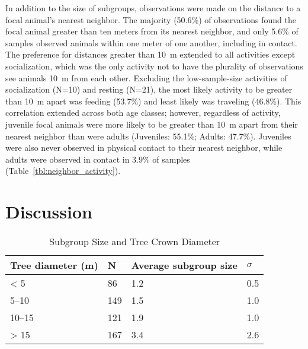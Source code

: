 \documentclass[american]{../../../coursework}
\begin{document}
In addition to the size of subgroups, observations were made on the distance
to a focal animal's nearest neighbor. The majority (50.6\%) of observations
found the focal animal greater than ten meters from its nearest neighbor, and
only 5.6\% of samples observed animals within one meter of one another,
including in contact. The preference for distances greater than
\SI{10}{\metre} extended to all activities except socialization, which was the
only activity not to have the plurality of observations see animals
\SI{10}{\metre} from each other. Excluding the low-sample-size activities of
socialization (N=10) and resting (N=21), the most likely activity to be
greater than \SI{10}{\metre} apart was feeding (53.7\%) and least likely was
traveling (46.8\%). This correlation extended across both age classes; however,
regardless of activity, juvenile focal animals were more likely to be greater
than \SI{10}{\metre} apart from their nearest neighbor than were adults
(Juveniles: 55.1\%; Adults: 47.7\%). Juveniles were also never observed in
physical contact to their nearest neighbor, while adults were observed in
contact in 3.9\% of samples (Table~\ref{tbl:neighbor_activity}).

\section{Discussion}

\begin{table}
    \caption{Subgroup Size and Tree Crown Diameter}
    \label{tbl:subgroup_crown}
    \begin{tabu} to \linewidth{XXXX}
        \toprule
        Tree diameter (\si{\metre}) & N & Average subgroup size & \(\sigma\) \\
        \midrule
        \num{< 5} & 86 & 1.2 & 0.5 \\
        \numrange{5}{10} & 149 & 1.5 & 1.0 \\
        \numrange{10}{15} & 121 & 1.9 & 1.0 \\
        \num{> 15} & 167 & 3.4 & 2.6 \\
        \bottomrule
    \end{tabu}
    \par{}
\end{table}
\end{document}
